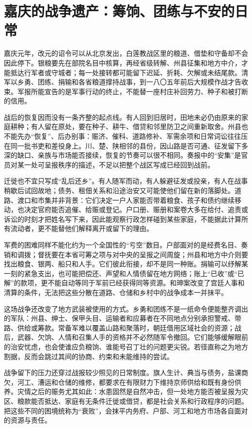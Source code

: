 \section{嘉庆的战争遗产：筹饷、团练与不安的日常}

嘉庆元年，改元的诏令可以从北京发出，白莲教战区里的粮道、借垫和守备却不会因此停下。银粮要先在部院名目中核算，再经省级转解、州县征集和地方中介，才能抵达行军者或守城者；每一处接转都可能留下迟延、折耗、欠解或未结尾款。清军以乡勇、团练、捐输和各省粮道撑持战事，到一八〇五年前后大规模作战才告收束。军报所能宣告的是军事行动的终止，不能替一座村庄补回劳力、种子和被打断的信用。

战后的恢复因而没有一条齐整的起点线。有人回到旧居时，田地未必仍由原来的家庭耕种；有人留在原处，要在种子、耕牛、借贷和邻里防卫之间重新取舍。州县也不能先办“恢复”、后办别事：赈济、催科、道路修补、军需余项和日常词讼往往压在同一批书吏和差役身上。川、楚、陕相邻的县份，因山路是否可通、征发留下多深的缺口、亲族与市场能否接续，恢复的节奏可以很不相同。奏报中的“安集”是官员对某一处可呈报秩序的描述，不足以把整个战区写成已经回到战前。

迁徙也不宜只写成“乱后还乡”。有人随军而动，有人躲避征发或投亲，有人在战事稍歇后试回故地；债务、租佃关系和沿途治安又可能使他们留在新的落脚处。道路、渡口和市集并非背景：它们决定一户人家能否带着粮食、孩子和债约继续移动，也决定官府能否追催、给赈或登记。户口册、赈册和案卷大多在给付、追责或诉讼的时刻才把姓名写下来，因此能观察行政怎样碰到某些家庭，不能据此计算所有流动者，更不能替他们解释离开或留下的理由。

军费的困难同样不能化约为一个全国性的“亏空”数目。户部面对的是经费名目、奏销和调拨；督抚要在本省可筹之项与对中央的呈报之间周旋；州县和地方中介则要找出粮食、银两、船只和人手。它们彼此衔接，却不是同一种账。捐输可以纾解某一刻的紧急支出，也可能把偿还、声望和人情债留在地方网络；账上“已收”或“已解”的款项，更不能自动等同于军前已经获得同等资源。和珅案改变了宫廷人事和清算的条件，无法把这些分散在道路、仓储和乡村中的战争成本一并抹平。

这场战争还改变了地方武装被使用的方式。乡勇和团练不是一纸命令便能整齐调出的军队：州县、绅士、保甲头目、运输者和应募者在不同地点分别承担警戒、带路、供给或筹款。常备军难以覆盖山路和聚落时，朝廷借用区域社会的资源；战后，武器、欠饷、人情和召集人手的资格并不必然随军令撤回。它们能够缓解眼前的治安忧虑，也会使谁应负粮饷、谁能号召丁壮的问题更尖锐。若径直称之为地方割据，反而会跳过其间的协商、约束和未能维持的尝试。

战争留下的压力还穿过战报较少照见的日常制度。旗人生计、典当与债务，盐课商欠，河工、漕运和仓储的维修，都要求在有限财力下维持京师供给和既有身份供养。灾情之后的赈务尤其如此：水患固然是自然冲击，但一处地方能否被呈报为灾区、粮款能否抵达、家庭有无条件迁徙或借贷，都是社会关系和行政程序的问题。把这些不同的困境统称为“衰败”，会抹平内务府、户部、河工和地方市场各自面对的资源与责任。

